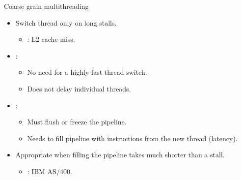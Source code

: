\begin{frame}[t]{Coarse grain multithreading}
\begin{itemize}
  \item Switch thread only on long stalls.
    \begin{itemize}
      \item {}: L2 cache miss.
    \end{itemize}

  \item {}:
    \begin{itemize}
      \item No need for a highly fast thread switch.
      \item Does not delay individual threads.
    \end{itemize}

  \item {}:
    \begin{itemize}
      \item Must flush or freeze the pipeline.
      \item Needs to fill pipeline with instructions from the new thread (latency).
    \end{itemize}

  \item Appropriate when filling the pipeline takes much shorter than a stall.
    \begin{itemize}
      \item {}: IBM AS/400.
    \end{itemize}
\end{itemize}
\end{frame}

